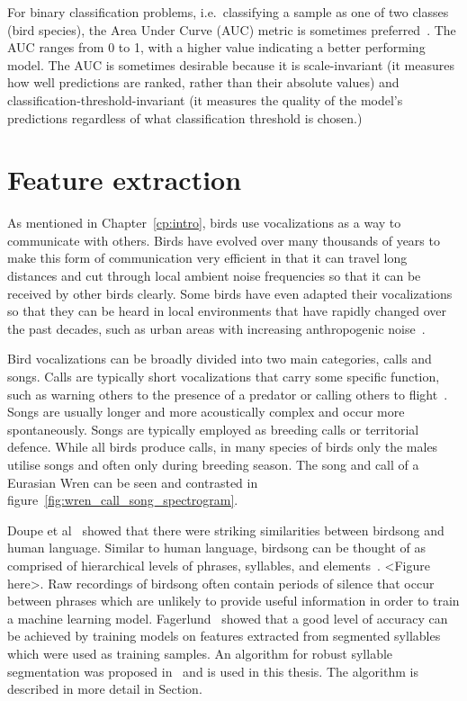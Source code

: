 For binary classification problems, i.e.\ classifying a sample as one of two
classes (bird species), the Area Under Curve (AUC) metric is sometimes
preferred~\cite{leng2014multi}. The AUC ranges from 0 to 1, with a higher value
indicating a better performing model. The AUC is sometimes desirable because it
is scale-invariant (it measures how well predictions are ranked, rather than
their absolute values) and classification-threshold-invariant (it measures the
quality of the model's predictions regardless of what classification threshold
is chosen.)

\section{Feature extraction}

As mentioned in Chapter~\ref{cp:intro}, birds use vocalizations as a way to
communicate with others. Birds have evolved over many thousands of years to
make this form of communication very efficient in that it can travel long
distances and cut through local ambient noise frequencies so that it can be
received by other birds clearly. Some birds have even adapted their
vocalizations so that they can be heard in local environments that have rapidly
changed over the past decades, such as urban areas with increasing anthropogenic
noise~\cite{luther2010urban}.

Bird vocalizations can be broadly divided into two main categories, calls and
songs. Calls are typically short vocalizations that carry some specific
function, such as warning others to the presence of a predator or calling others
to flight~\cite{MARLER2004132}. Songs are usually longer and more acoustically
complex and occur more spontaneously. Songs are typically employed as breeding
calls or territorial defence. While all birds produce calls, in many species of
birds only the males utilise songs and often only during breeding season. The
song and call of a Eurasian Wren can be seen and contrasted in
figure~\ref{fig:wren_call_song_spectrogram}.

Doupe et al~\cite{birdsongspeech} showed that there were striking similarities
between birdsong and human language. Similar to human language, birdsong can be
thought of as comprised of hierarchical levels of phrases, syllables, and
elements~\cite{catchpole2003bird}. <Figure here>. Raw recordings of birdsong
often contain periods of silence that occur between phrases which are unlikely
to provide useful information in order to train a machine learning model.
Fagerlund~\cite{fagerlund2007bird} showed that a good level of accuracy can be
achieved by training models on features extracted from segmented syllables which
were used as training samples. An algorithm for robust syllable segmentation was
proposed in~\cite{fagerlund2004automatic} and is used in this thesis. The
algorithm is described in more detail in Section.

